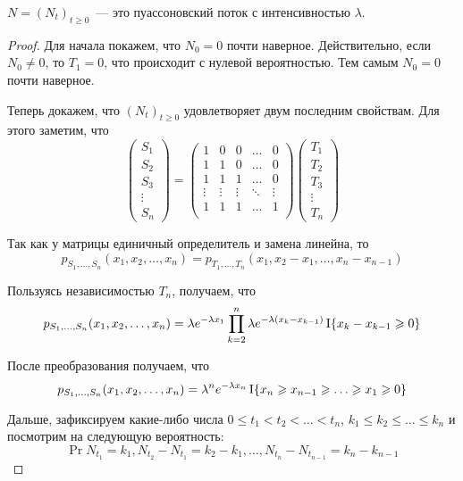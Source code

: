 \begin{property}
	\(N = (N_{t})_{t \geq 0}\)~--- это пуассоновский поток с интенсивностью 
	\(\lambda\).
\end{property}
\begin{proof}
	Для начала покажем, что \(N_{0} = 0\) почти наверное. Действительно, если 
	\(N_{0} \neq 0\), то \(T_{1} = 0\), что происходит с 
	нулевой вероятностью. Тем самым \(N_{0} = 0\) почти наверное.
	
	Теперь докажем, что \((N_{t})_{t \geq 0}\) удовлетворяет двум последним 
	свойствам. Для этого заметим, что
	\[
	\begin{pmatrix}
	S_{1} \\ S_{2} \\ S_{3} \\ \vdots \\ S_{n} 
	\end{pmatrix}
	=
	\begin{pmatrix}
	1 & 0 & 0 & \ldots & 0 \\
	1 & 1 & 0 & \ldots & 0 \\
	1 & 1 & 1 & \ldots & 0 \\
	\vdots & \vdots & \vdots & \ddots & \vdots \\
	1 & 1 & 1 & \ldots & 1 \\
	\end{pmatrix}
	\begin{pmatrix}
	T_{1} \\ T_{2} \\ T_{3} \\ \vdots \\ T_{n} 
	\end{pmatrix}
	\]
	
	Так как у матрицы единичный определитель и замена линейна, то
	\[
	p_{S_{1}, \dots, S_{n}}(x_{1}, x_{2}, \dots, x_{n}) = p_{T_{1}, \dots, 
		T_{n}}(x_{1}, x_{2} - x_{1}, \dots, x_{n} - x_{n - 1})
	\]
	
	Пользуясь независимостью \(T_{n}\), получаем, что
	\[
	p_{S_{1}, \dots, S_{n}}(x_{1}, x_{2}, \dots, x_{n}) = \lambda 
	e^{-\lambda x_{1}}\prod_{k = 2}^{n}\lambda e^{-\lambda(x_{k} - x_{k - 
			1})}\operatorname{\mathrm{I}}\{x_{k} - x_{k - 1} \geqslant 0\}
	\]
	
	После преобразования получаем, что
	\[
	p_{S_{1}, \dots, S_{n}}(x_{1}, x_{2}, \dots, x_{n}) = 
	\lambda^{n}e^{-\lambda x_{n}}\operatorname{\mathrm{I}}\{x_{n} \geqslant x_{n - 1} \geqslant \ldots \geqslant 
	x_{1} \geqslant 0\}
	\]
	
	Дальше, зафиксируем какие-либо числа \(0 \leq t_{1} < t_{2} < \dots < 
	t_{n}\), \(k_{1} \leq k_{2} \leq \dots \leq k_{n}\) и посмотрим на 
	следующую вероятность:
	\[
	\Pr{N_{t_{1}} = k_{1}, N_{t_{2}} - N_{t_{1}} = k_{2} - k_{1}, \dots, 
		N_{t_{n}} - N_{t_{n - 1}} = k_{n} -  k_{n - 1}}
	\]
	

\end{proof}
